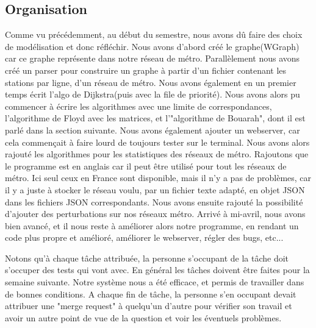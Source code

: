 \documentclass[french, 12pt]{article}
\begin{document}
\subsection{Organisation}
Comme vu précédemment, au début du semestre, nous avons dû faire des choix de modélisation et donc réfléchir. Nous avons d'abord créé le graphe(W\-Graph) car ce graphe représente dans notre réseau de métro.
Parallèlement nous avons créé un parser pour construire un graphe à partir d'un fichier contenant les stations par ligne, d'un réseau de métro.
Nous avons également en un premier temps écrit l'algo de Dijkstra(puis avec la file de priorité).
Nous avons alors pu commencer à écrire les algorithmes avec une limite de correspondances, l'algorithme de Floyd avec les matrices, et l'"algorithme de Bouarah", dont il est parlé dans la section suivante.
Nous avons également ajouter un webserver, car cela commençait à faire lourd de toujours tester sur le terminal.
Nous avons alors rajouté les algorithmes pour les statistiques des réseaux de métro.
Rajoutons que le programme est en anglais car il peut être utilisé pour tout les réseaux de métro. Ici seul ceux en France sont disponible, mais il n'y a pas de problèmes, car il y a juste à stocker le réseau voulu, par un fichier texte adapté, en objet JSON dans les fichiers JSON correspondants.
Nous avons ensuite rajouté la possibilité d'ajouter des perturbations sur nos réseaux métro.
Arrivé à mi-avril, nous avons bien avancé, et il nous reste à améliorer alors notre programme, en rendant un code plus propre et amélioré, améliorer le webserver, régler des bugs, etc...

Notons qu'à chaque tâche attribuée, la personne s'occupant de la tâche doit s'occuper des tests qui vont avec. En général les tâches doivent être faites pour la semaine suivante.
Notre système nous a été efficace, et permis de travailler dans de bonnes conditions.
A chaque fin de tâche, la personne s'en occupant devait attribuer une "merge request" à quelqu'un d'autre pour vérifier son travail et avoir un autre point de vue de la question et voir les éventuels problèmes.
\end{document}
